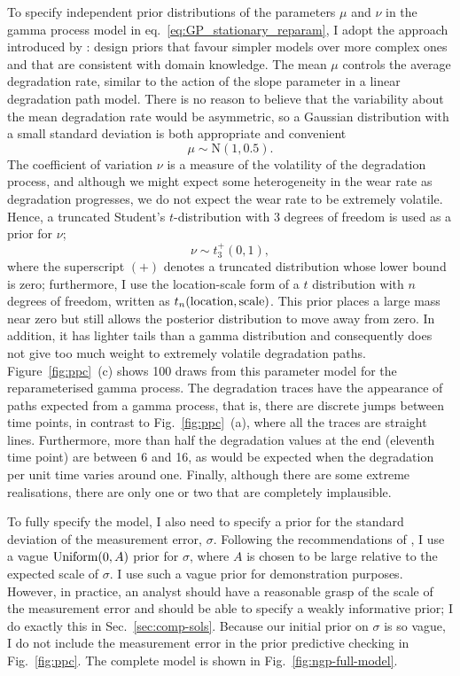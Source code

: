 To specify independent prior distributions of the parameters $\mu$ and $\nu$ in the gamma process model in eq.~\eqref{eq:GP_stationary_reparam}, I adopt the approach introduced by \citet{Simpson_2017}: design priors that favour simpler models over more complex ones and that are consistent with domain knowledge. The mean $\mu$ controls the average degradation rate, similar to the action of the slope parameter in a linear degradation path model. There is no reason to believe that the variability about the mean degradation rate would be asymmetric, so a Gaussian distribution with a small standard deviation is both appropriate and convenient
\begin{equation*}
  \mu \sim \mbox{N}(1, 0.5).
\end{equation*}
The coefficient of variation $\nu$ is a measure of the volatility of the degradation process, and although we might expect some heterogeneity in the wear rate as degradation progresses, we do not expect the wear rate to be extremely volatile. Hence, a truncated Student's $t$-distribution with 3 degrees of freedom is used as a prior for $\nu$;
\begin{equation*}
  \nu \sim t_3^{+}(0, 1),
\end{equation*}
where the superscript $(+)$ denotes a truncated distribution whose lower bound is zero; furthermore, I use the location-scale form of a $t$ distribution with $n$ degrees of freedom, written as $t_n(\hbox{location}, \hbox{scale})$. This prior places a large mass near zero but still allows the posterior distribution to move away from zero. In addition, it has lighter tails than a gamma distribution and consequently does not give too much weight to extremely volatile degradation paths. Figure~\ref{fig:ppc}~(c) shows 100 draws from this parameter model for the reparameterised gamma process. The degradation traces have the appearance of paths expected from a gamma process, that is, there are discrete jumps between time points, in contrast to Fig.~\ref{fig:ppc}~(a), where all the traces are straight lines. Furthermore, more than half the degradation values at the end (eleventh time point) are between 6 and 16, as would be expected when the degradation per unit time varies around one. Finally, although there are some extreme realisations, there are only one or two that are completely implausible.

To fully specify the model, I also need to specify a prior for the standard deviation of the measurement error, $\sigma$. Following the recommendations of \citet[Chap.~17]{gelman_workflow_2020}, I use a vague $\hbox{Uniform}(0, A)$ prior for $\sigma$, where $A$ is chosen to be large relative to the expected scale of $\sigma$. I use such a vague prior for demonstration purposes. However, in practice, an analyst should have a reasonable grasp of the scale of the measurement error and should be able to specify a weakly informative prior; I do exactly this in Sec.~\ref{sec:comp-sols}. Because our initial prior on $\sigma$ is so vague, I do not include the measurement error in the prior predictive checking in Fig.~\ref{fig:ppc}. The complete model is shown in Fig.~\ref{fig:ngp-full-model}.

